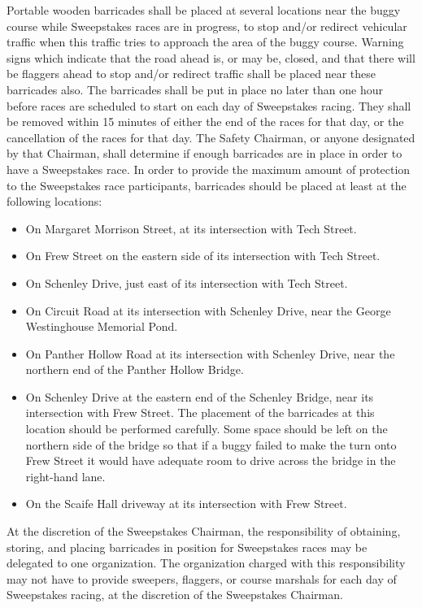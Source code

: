 Portable wooden barricades shall be placed at several locations near the buggy course while Sweepstakes races are in progress, to stop and/or redirect vehicular traffic when this traffic tries to approach the area of the buggy course. Warning signs which indicate that the road ahead is, or may be, closed, and that there will be flaggers ahead to stop and/or redirect traffic shall be placed near these barricades also. The barricades shall be put in place no later than one hour before races are scheduled to start on each day of Sweepstakes racing. They shall be removed within 15 minutes of either the end of the races for that day, or the cancellation of the races for that day. The Safety Chairman, or anyone designated by that Chairman, shall determine if enough barricades are in place in order to have a Sweepstakes race. In order to provide the maximum amount of protection to the Sweepstakes race participants, barricades should be placed at least at the following locations:
\begin{itemize}
	\item On Margaret Morrison Street, at its intersection with Tech Street.
	\item On Frew Street on the eastern side of its intersection with Tech Street.
	\item On Schenley Drive, just east of its intersection with Tech Street.
	\item On Circuit Road at its intersection with Schenley Drive, near the George Westinghouse Memorial Pond.
	\item On Panther Hollow Road at its intersection with Schenley Drive, near the northern end of the Panther Hollow Bridge.
	\item On Schenley Drive at the eastern end of the Schenley Bridge, near its intersection with Frew Street. The placement of the barricades at this location should be performed carefully. Some space should be left on the northern side of the bridge so that if a buggy failed to make the turn onto Frew Street it would have adequate room to drive across the bridge in the right-hand lane.
	\item On the Scaife Hall driveway at its intersection with Frew Street.
\end{itemize}

At the discretion of the Sweepstakes Chairman, the responsibility of obtaining, storing, and placing barricades in position for Sweepstakes races may be delegated to one organization. The organization charged with this responsibility may not have to provide sweepers, flaggers, or course marshals for each day of Sweepstakes racing, at the discretion of the Sweepstakes Chairman.

